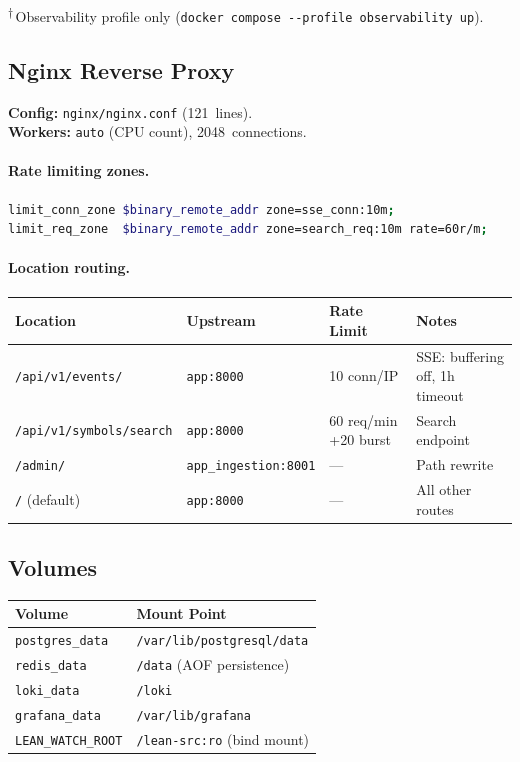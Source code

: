 \noindent\textsuperscript{$\dagger$}\,Observability profile only
(\texttt{docker compose -{}-profile observability up}).

\subsection{Nginx Reverse Proxy}

\textbf{Config:} \texttt{nginx/nginx.conf} (121~lines).\\
\textbf{Workers:} \texttt{auto} (CPU count), 2048~connections.

\paragraph{Rate limiting zones.}
\begin{lstlisting}[language=bash, caption={Nginx rate-limit zones}]
limit_conn_zone $binary_remote_addr zone=sse_conn:10m;
limit_req_zone  $binary_remote_addr zone=search_req:10m rate=60r/m;
\end{lstlisting}

\paragraph{Location routing.}

\begin{longtable}{@{}llll@{}}
\toprule
\textbf{Location} & \textbf{Upstream} & \textbf{Rate Limit} & \textbf{Notes} \\
\midrule
\endfirsthead
\bottomrule
\endfoot
\texttt{/api/v1/events/}     & \texttt{app:8000}            & 10 conn/IP    & SSE: buffering off, 1h timeout \\
\texttt{/api/v1/symbols/search} & \texttt{app:8000}         & 60 req/min +20 burst & Search endpoint \\
\texttt{/admin/}              & \texttt{app\_ingestion:8001} & ---           & Path rewrite \\
\texttt{/} (default)          & \texttt{app:8000}            & ---           & All other routes \\
\end{longtable}

\subsection{Volumes}

\begin{tabular}{@{}ll@{}}
\toprule
\textbf{Volume} & \textbf{Mount Point} \\
\midrule
\texttt{postgres\_data}  & \texttt{/var/lib/postgresql/data} \\
\texttt{redis\_data}     & \texttt{/data} (AOF persistence) \\
\texttt{loki\_data}      & \texttt{/loki} \\
\texttt{grafana\_data}   & \texttt{/var/lib/grafana} \\
\texttt{LEAN\_WATCH\_ROOT} & \texttt{/lean-src:ro} (bind mount) \\
\bottomrule
\end{tabular}
